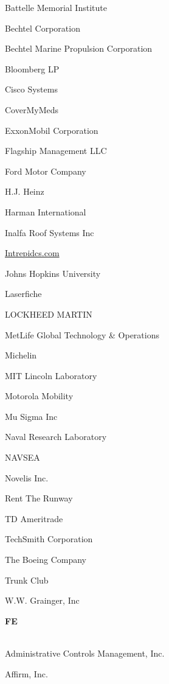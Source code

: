 \documentclass[twoside]{article}
\begin{document}
\begin{center}
\begin{multicols}{5}
\begin{FlushLeft}
\begin{compactitem}
\item Battelle Memorial Institute
\item Bechtel Corporation
\item Bechtel Marine Propulsion Corporation
\item Bloomberg LP
\item Cisco Systems
\item CoverMyMeds
\item ExxonMobil Corporation
\item Flagship Management LLC
\item Ford Motor Company
\item H.J. Heinz
\item Harman International
\item Inalfa Roof Systems Inc
\item \url{Intrepidcs.com}
\item Johns Hopkins University
\item Laserfiche
\item LOCKHEED MARTIN
\item MetLife Global Technology \& Operations
\item Michelin
\item MIT Lincoln Laboratory
\item Motorola Mobility
\item Mu Sigma Inc
\item Naval Research Laboratory
\item NAVSEA
\item Novelis Inc.
\item Rent The Runway
\item TD Ameritrade
\item TechSmith Corporation
\item The Boeing Company
\item Trunk Club
\item W.W. Grainger, Inc
\end{compactitem}
        \end{FlushLeft}
        \vspace{1em}
        {\fontsize{14}{16}\selectfont \bf FE}\\
        \vspace{-1em}
        ~\hrulefill~
        \vspace{-.9em}
        \begin{FlushLeft}
        \begin{compactitem}
        \item Administrative Controls Management, Inc.
\item Affirm, Inc.

\end{compactitem}
\end{FlushLeft}
\end{multicols}
\end{center}
\end{document}
